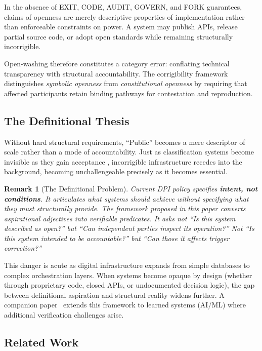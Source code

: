 \documentclass{article}
\newtheorem{remark}{Remark}[section]
\begin{document}
In the absence of EXIT, CODE, AUDIT, GOVERN, and FORK guarantees, claims of openness are merely descriptive properties of implementation rather than enforceable constraints on power. A system may publish APIs, release partial source code, or adopt open standards while remaining structurally incorrigible.

Open-washing therefore constitutes a category error: conflating technical transparency with structural accountability. The corrigibility framework distinguishes \textit{symbolic openness} from \textit{constitutional openness} by requiring that affected participants retain binding pathways for contestation and reproduction.

\subsection{The Definitional Thesis}

Without hard structural requirements, ``Public'' becomes a mere descriptor of scale rather than a mode of accountability. Just as classification systems become invisible as they gain acceptance \citep{bowker1999}, incorrigible infrastructure recedes into the background, becoming unchallengeable precisely as it becomes essential.

\begin{remark}[The Definitional Problem]
Current DPI policy specifies \textbf{intent, not conditions}. It articulates what systems \textit{should} achieve without specifying what they \textit{must} structurally provide. The framework proposed in this paper converts aspirational adjectives into verifiable predicates. It asks not ``Is this system described as open?'' but ``Can independent parties inspect its operation?'' Not ``Is this system intended to be accountable?'' but ``Can those it affects trigger correction?''
\end{remark}

This danger is acute as digital infrastructure expands from simple databases to complex orchestration layers. When systems become opaque by design (whether through proprietary code, closed APIs, or undocumented decision logic), the gap between definitional aspiration and structural reality widens further. A companion paper~\citep{aravind2026epi} extends this framework to learned systems (AI/ML) where additional verification challenges arise.

\subsection{Related Work}
\end{document}

